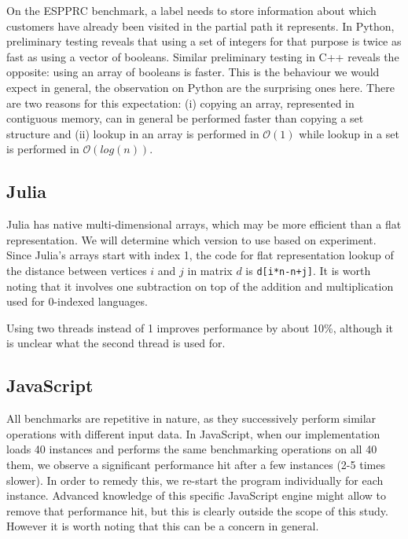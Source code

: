 \documentclass[11pt,a4paper,notitlepage]{article}
\begin{document}
On the ESPPRC benchmark, a label needs to store information about
which customers have already been visited in the partial path it
represents. In Python, preliminary testing reveals that using a set of
integers for that purpose is twice as fast as using a vector of
booleans. Similar preliminary testing in C++ reveals the opposite:
using an array of booleans is faster. This is the behaviour we would
expect in general, the observation on Python are the surprising ones
here. There are two reasons for this expectation: (i) copying an array,
represented in contiguous memory, can in general be performed faster
than copying a set structure and (ii) lookup in an array is performed
in $\mathcal{O}(1)$ while lookup in a set is performed in
$\mathcal{O}(log(n))$.

\subsection{Julia}
Julia has native multi-dimensional arrays, which may be more efficient
than a flat representation. We will determine which version to use
based on experiment. Since Julia's arrays start with index 1, the code
for flat representation lookup of the distance between vertices $i$
and $j$ in matrix $d$ is \lstinline{d[i*n-n+j]}. It is worth noting
that it involves one subtraction on top of the addition and
multiplication used for 0-indexed languages.


Using two threads instead of 1 improves performance by about 10\%,
although it is unclear what the second thread is used for.


\subsection{JavaScript}
All benchmarks are repetitive in nature, as they successively perform similar
operations with different input data. In JavaScript, when our
implementation loads 40 instances and performs the same
benchmarking operations on all 40 them, we observe a significant performance
hit after a few instances (2-5 times slower). In order to remedy this,
we re-start the program individually for each instance. Advanced
knowledge of this specific JavaScript engine might allow to remove that
performance hit, but this is clearly outside the scope of this
study. However it is worth noting that this can be a concern in general.
\end{document}
